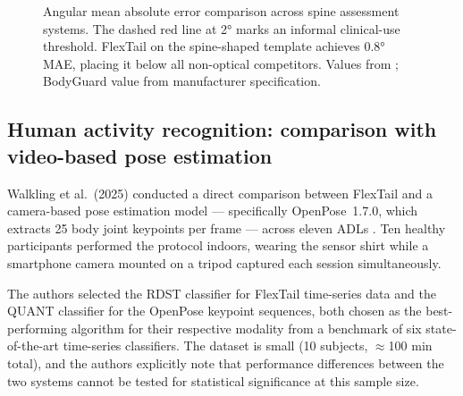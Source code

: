 \begin{figure}[!b]
	\centering
	\caption{Angular mean absolute error comparison across spine assessment systems. The dashed red line at \ang{2} marks an informal clinical-use threshold. FlexTail on the spine-shaped template achieves \ang{0.8} MAE, placing it below all non-optical competitors. Values from \cite{walkling2025, spinalMouse, madgwick2011}; BodyGuard value from manufacturer specification.}
	\label{fig:accuracy_bar}
\end{figure}

\subsection{Human activity recognition: comparison with video-based pose estimation}

Walkling et al.\ (2025) conducted a direct comparison between FlexTail and a
camera-based pose estimation model --- specifically OpenPose~1.7.0, which extracts
25 body joint keypoints per frame --- across eleven \acp{ADL} \cite{walkling2025}.
Ten healthy participants performed the protocol indoors, wearing the sensor shirt
while a smartphone camera mounted on a tripod captured each session simultaneously.

The authors selected the \ac{RDST} classifier for FlexTail time-series data and the
QUANT classifier for the OpenPose keypoint sequences, both chosen as the best-performing
algorithm for their respective modality from a benchmark of six state-of-the-art
time-series classifiers.
The dataset is small (10 subjects, $\approx$100 min total), and the authors
explicitly note that performance differences between the two systems cannot be tested
for statistical significance at this sample size.

